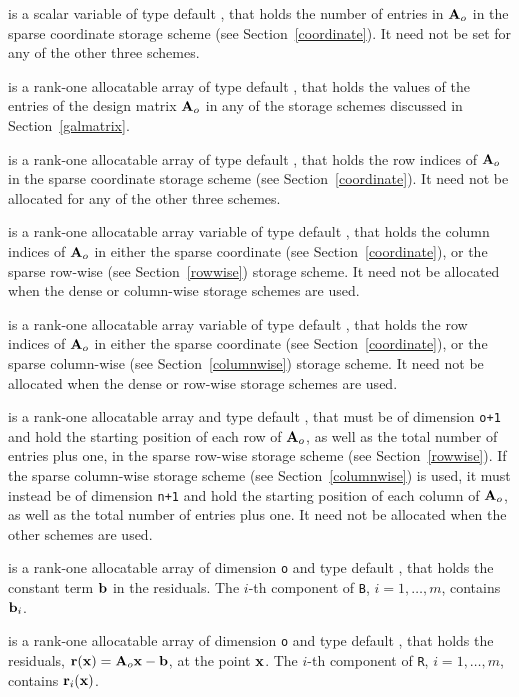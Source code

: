 \documentclass{galahad}
\begin{document}
\begin{description}
\begin{description}
 is a scalar variable of type default \integer, that
holds the number of entries in ${\mathbf{A}}_o$
in the sparse coordinate storage scheme (see Section~\ref{coordinate}).
It need not be set for any of the other three schemes.

 is a rank-one allocatable array of type default \realdp, that 
holds the values of the entries of the design matrix ${\mathbf{A}}_o$ in any of the
storage schemes discussed in Section~\ref{galmatrix}.

 is a rank-one allocatable array of type default \integer,
that holds the row indices of ${\mathbf{A}}_o$ in the sparse coordinate storage
scheme (see Section~\ref{coordinate}).
It need not be allocated for any of the other three schemes.

 is a rank-one allocatable array variable of type default \integer,
that holds the column indices of ${\mathbf{A}}_o$ in either the sparse coordinate
(see Section~\ref{coordinate}), or the sparse row-wise
(see Section~\ref{rowwise}) storage scheme.
It need not be allocated when the dense or column-wise storage schemes are used.

 is a rank-one allocatable array variable of type default \integer,
that holds the row indices of ${\mathbf{A}}_o$ in either the sparse coordinate
(see Section~\ref{coordinate}), or the sparse column-wise
(see Section~\ref{columnwise}) storage scheme.
It need not be allocated when the dense or row-wise storage schemes are used.

 is a rank-one allocatable array and type default \integer,
that must be of dimension {\tt o+1}
and hold the starting position of each row of ${\mathbf{A}}_o$, as well
as the total number of entries plus one, in the sparse row-wise storage
scheme (see Section~\ref{rowwise}).
If the sparse column-wise storage scheme (see Section~\ref{columnwise})
is used, it must instead be of dimension {\tt n+1}
and hold the starting position of each column of ${\mathbf{A}}_o$, as well
as the total number of entries plus one.
It need not be allocated when the
other schemes are used.

\end{description}

 is a rank-one allocatable array of dimension {\tt o} and type
default \realdp, that holds the constant term ${\mathbf{b}}$ in the residuals.
The $i$-th component of {\tt B}, $i = 1, \ldots, m$, contains ${\mathbf{b}}_{i}$.

 is a rank-one allocatable array of dimension {\tt o} and type
default \realdp, that holds the residuals, ${\mathbf{r}}({\mathbf{x}}) = {\mathbf{A}}_o {\mathbf{x}} - {\mathbf{b}}$,
at the point ${\mathbf{x}}$. The $i$-th component of
{\tt R}, $i = 1, \ldots, m$, contains ${\mathbf{r}}_{i}({\mathbf{x}})$.


\end{description}
\end{document}

